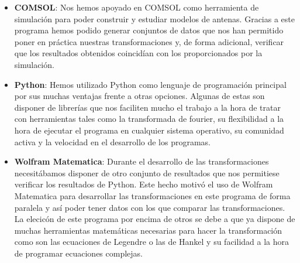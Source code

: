 \begin{itemize}
    \item \textbf{COMSOL}: Nos hemos apoyado en COMSOL como herramienta de simulación para poder construir y estudiar modelos de antenas. Gracias a este programa hemos podido generar conjuntos de datos que nos han permitido poner en práctica nuestras transformaciones y, de forma adicional, verificar que los resultados obtenidos coincidían con los proporcionados por la simulación.

    \item \textbf{Python}: Hemos utilizado Python como lenguaje de programación principal por sus muchas ventajas frente a otras opciones. Algunas de estas son disponer de librerías que nos faciliten mucho el trabajo a la hora de tratar con herramientas tales como la transformada de fourier, su flexibilidad a la hora de ejecutar el programa en cualquier sistema operativo, su comunidad activa y la velocidad en el desarrollo de los programas.

    \item \textbf{Wolfram Matematica}: Durante el desarrollo de las transformaciones necesitábamos disponer de otro conjunto de resultados que nos permitiese verificar los resultados de Python. Este hecho motivó el uso de Wolfram Matematica para desarrollar las transformaciones en este programa de forma paralela y así poder tener datos con los que comparar las transformaciones. La elecicón de este programa por encima de otros se debe a que ya dispone de muchas herramientas matemáticas necesarias para hacer la transformación como son las ecuaciones de Legendre o las de Hankel y su facilidad a la hora de programar ecuaciones complejas.
\end{itemize}